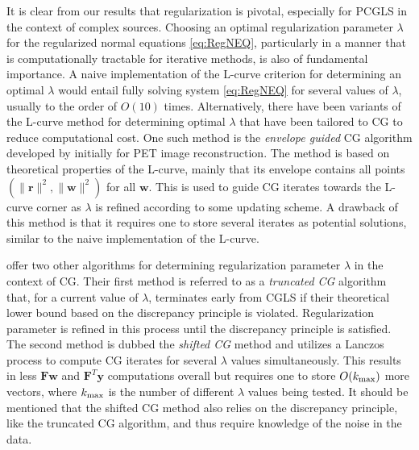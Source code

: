 It is clear from our results that regularization is pivotal, especially for PCGLS in the context of complex sources.
Choosing an optimal regularization parameter $\lambda$ for the regularized normal equations \ref{eq:RegNEQ}, particularly in a manner that is computationally tractable for iterative methods, is also of fundamental importance.%
A naive implementation of the L-curve criterion for determining an optimal $\lambda$ would entail fully solving system \ref{eq:RegNEQ} for several values of $\lambda$, usually to the order of $O(10)$ times.
Alternatively, there have been variants of the L-curve method for determining optimal $\lambda$ that have been tailored to CG to reduce computational cost.
One such method is the {\em envelope guided} CG algorithm developed by \cite{Kaufman:96} initially for PET image reconstruction.
The method is based on theoretical properties of the L-curve, mainly that its envelope contains all points $(\|\mathbf r\|^2,\|\mathbf w\|^2)$ for all $\mathbf w$.
This is used to guide CG iterates towards the L-curve corner as $\lambda$ is refined according to some updating scheme.
A drawback of this method is that it requires one to store several iterates as potential solutions, similar to the naive implementation of the L-curve.

\cite{Frommer:99} offer two other algorithms for determining regularization parameter $\lambda$ in the context of CG.
Their first method is referred to as a {\em truncated CG} algorithm that, for a current value of $\lambda$, terminates early from CGLS if their theoretical lower bound based on the discrepancy principle is violated.
Regularization parameter is refined in this process until the discrepancy principle is satisfied.
The second method is dubbed the {\em shifted CG} method and utilizes a Lanczos process to compute CG iterates for several $\lambda$ values simultaneously.
This results in less $\mathbf F\mathbf w$ and $\mathbf F^T\mathbf y$ computations overall but requires one to store $O(k_{\rm max})$ more vectors, where $k_{\rm max}$ is the number of different $\lambda$ values being tested.
It should be mentioned that the shifted CG method also relies on the discrepancy principle, like the truncated CG algorithm, and thus require knowledge of the noise in the data.

 




